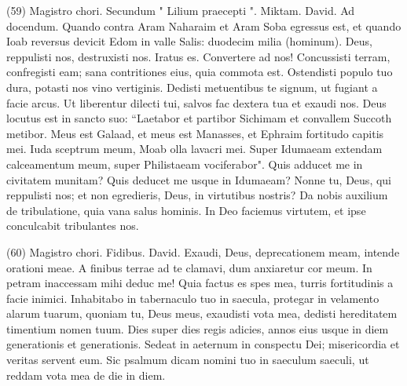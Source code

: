 \begin{biblechapter}  (59) 
\verse  Magistro chori. Secundum " Lilium praecepti ". Miktam. David. Ad docendum. 
\verse Quando contra Aram Naharaim et Aram Soba egressus est, et quando Ioab reversus devicit Edom in valle Salis: duodecim milia (hominum). 
\verse Deus, reppulisti nos, destruxisti nos. Iratus es. Convertere ad nos! 
\verse Concussisti terram, confregisti eam; sana contritiones eius, quia commota est. 
\verse Ostendisti populo tuo dura, potasti nos vino vertiginis. 
\verse Dedisti metuentibus te signum, ut fugiant a facie arcus. 
\verse Ut liberentur dilecti tui, salvos fac dextera tua et exaudi nos. 
\verse Deus locutus est in sancto suo: “Laetabor et partibor Sichimam et convallem Succoth metibor. 
\verse Meus est Galaad, et meus est Manasses, et Ephraim fortitudo capitis mei. Iuda sceptrum meum, 
\verse Moab olla lavacri mei. Super Idumaeam extendam calceamentum meum, super Philistaeam vociferabor". 
\verse Quis adducet me in civitatem munitam? Quis deducet me usque in Idumaeam? 
\verse Nonne tu, Deus, qui reppulisti nos; et non egredieris, Deus, in virtutibus nostris? Da nobis auxilium de tribulatione, quia vana salus hominis. 
\verse In Deo faciemus virtutem, et ipse conculcabit tribulantes nos. 
\end{biblechapter}

\begin{biblechapter}  (60) 
\verse  Magistro chori. Fidibus. David. 
\verse Exaudi, Deus, deprecationem meam, intende orationi meae. 
\verse A finibus terrae ad te clamavi, dum anxiaretur cor meum. In petram inaccessam mihi deduc me! 
\verse Quia factus es spes mea, turris fortitudinis a facie inimici. 
\verse Inhabitabo in tabernaculo tuo in saecula, protegar in velamento alarum tuarum, 
\verse quoniam tu, Deus meus, exaudisti vota mea, dedisti hereditatem timentium nomen tuum. 
\verse Dies super dies regis adicies, annos eius usque in diem generationis et generationis. 
\verse Sedeat in aeternum in conspectu Dei; misericordia et veritas servent eum. 
\verse Sic psalmum dicam nomini tuo in saeculum saeculi, ut reddam vota mea de die in diem. 
\end{biblechapter}

